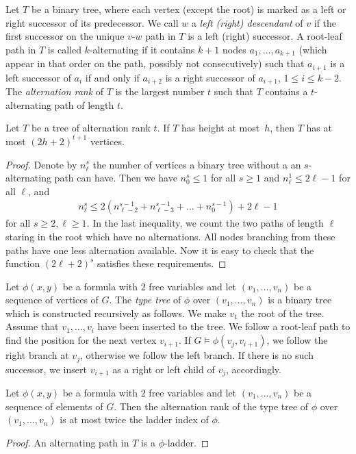 Let $T$ be a binary tree, where each vertex (except the root) is 
marked as a left or right successor of its predecessor. We call $w$ 
a \emph{left (right) descendant} of $v$ if the first successor on the unique
$v$-$w$ path in $T$ is a left (right) successor. A root-leaf path in $T$ is called
$k$-alternating if it contains $k+1$ nodes $a_1,\ldots, a_{k+1}$ (which appear
in that order on the path, possibly not consecutively) such that $a_{i+1}$ is a left successor of $a_i$
if and only if $a_{i+2}$ is a right successor of $a_{i+1}$, $1\leq i\leq k-2$. 
The \emph{alternation rank} of $T$ is the largest number $t$ such that 
$T$ contains a $t$-alternating path of length $t$.

\begin{lemma}\label{lem:number-of-nodes}
Let $T$ be a tree of alternation rank $t$. If
$T$ has height at most~$h$, then $T$ has at most $(2h+2)^{t+1}$
vertices. 
\end{lemma}
\begin{proof}
Denote by $n_\ell^s$ the number of vertices a binary tree without a 
an $s$-alternating path can have. Then we have $n_0^s\leq 1$ for all $s\geq 1$
and $n_\ell^1\leq 2\ell-1$ for all $\ell$, and 
\begin{align*}
n_\ell^s\leq 2(n_{\ell-2}^{s-1}+n_{\ell-3}^{s-1}+\ldots + n_{0}^{s-1})+2\ell-1
\end{align*}
for all $s\geq 2,\ell\geq 1$. In the last inequality, we count the two paths of length
$\ell$ staring in the root which have no alternations. All nodes branching from 
these paths have one less alternation available. 
Now it is easy to check that the function $(2\ell+2)^s$ satisfies these requirements. 
\end{proof}

Let $\phi(x,y)$ be a formula with $2$ free variables and let $(v_1,\ldots, v_n)$
be a sequence of vertices of $G$. The \emph{type tree}
of $\phi$ over $(v_1,\ldots,v_n)$ is a binary tree which is constructed recursively as 
follows. We make $v_1$ the root of the tree. Assume that $v_1,\ldots, v_i$
have been inserted to the tree. We follow a root-leaf path to find the
position for the next vertex $v_{i+1}$. If $G\models\phi(v_j,v_{i+1})$, we
follow the right branch at $v_j$, otherwise we follow the left branch. If there is
no such successor, we insert $v_{i+1}$ as a right or left child of $v_j$, 
accordingly. 

\begin{lemma}
Let $\phi(x,y)$ be a formula with $2$ free variables and let
$(v_1,\ldots, v_n)$ be a sequence of elements of $G$. Then the 
alternation rank of the type tree of $\phi$ over $(v_1,\ldots, v_n)$
is at most twice the ladder index of $\phi$. 
\end{lemma}
\begin{proof}
An alternating path in $T$ is a $\phi$-ladder.
\end{proof}

